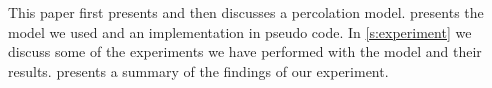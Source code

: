 \noindent This paper first presents and then discusses a percolation model.  presents the model we used and an implementation in pseudo code. In \cref{s:experiment} we discuss some of the experiments we have performed with the model and their results.  presents a summary of the findings of our experiment. 

